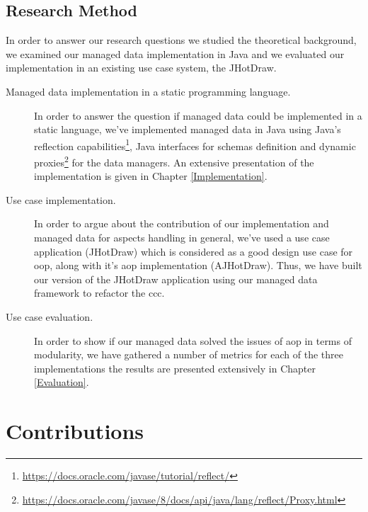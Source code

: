 \subsection{Research Method}\label{Research Method}
In order to answer our research questions we studied the theoretical background, we examined our managed data implementation in Java and we evaluated our implementation in an existing use case system, the JHotDraw.

\begin{description}

  \item[Managed data implementation in a static programming language.]
  In order to answer the question if managed data could be implemented in a static language, we've implemented managed data in Java 
  using Java's reflection capabilities\footnote{\url{https://docs.oracle.com/javase/tutorial/reflect/}}, Java interfaces 
  for schemas definition and dynamic proxies\footnote{\url{https://docs.oracle.com/javase/8/docs/api/java/lang/reflect/Proxy.html}}
  for the data managers. An extensive presentation of the implementation is given in Chapter \ref{Implementation}.

  \item[Use case implementation.] 
  In order to argue about the contribution of our implementation and managed data for aspects handling in general, we've used a use case application (JHotDraw) which is considered as a good design use case for \ac{oop}, along with it's \ac{aop} implementation (AJHotDraw).
  Thus, we have built our version of the JHotDraw application using our managed data framework to refactor the \ac{ccc}.

  \item[Use case evaluation.]
  In order to show if our managed data solved the issues of \ac{aop} in terms of modularity, we have gathered a number of metrics for each of the three implementations the results are presented extensively in Chapter \ref{Evaluation}.

\end{description}	

\section{Contributions}\label{Contributions}

